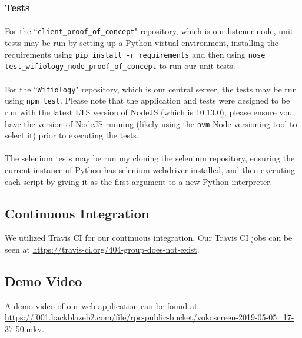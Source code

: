\documentclass[]{article}
\begin{document}
	
	
	\subsubsection{Tests}
	
	\paragraph{} For the ``\texttt{client\_proof\_of\_concept}" repository, which is our listener node, 
	unit tests may be run by setting up a
	Python virtual environment, installing the requirements using \texttt{pip install -r requirements} and then using 
	\texttt{nose test\_wifiology\_node\_proof\_of\_concept} to run our unit tests.
	
	\paragraph{} For the ``\texttt{Wifiology}" repository, which is our central server, the tests may be run using
	\texttt{npm test}. Please note that the application and tests were designed to be run with the latest LTS version
	of NodeJS (which is 10.13.0); please ensure you have the version of NodeJS running (likely using the \texttt{nvm} 
	Node versioning tool to select it) prior to executing the tests.
	
	\paragraph{} The selenium tests may be run my cloning the selenium repository, ensuring the current instance of 
	Python has selenium webdriver installed, and then executing each script by giving it as the first argument to
	a new Python interpreter.
	
	\subsection{Continuous Integration}
	
	We utilized Travis CI for our continuous integration. Our Travis CI jobs can be seen at 
	\href{https://travis-ci.org/404-group-does-not-exist}{https://travis-ci.org/404-group-does-not-exist}.
	
	\subsection{Demo Video}
	
	A demo video of our web application can be found at \href{	https://f001.backblazeb2.com/file/rpc-public-bucket/vokoscreen-2019-05-05\_17-37-50.mkv}{https://f001.backblazeb2.com/file/rpc-public-bucket/vokoscreen-2019-05-05\_17-37-50.mkv}.
	
\end{document}
